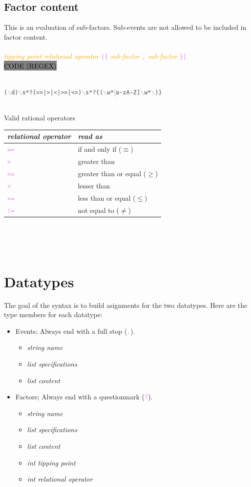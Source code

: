 \documentclass[15pt,a4paper,oneside]{article}
\newcommand{\regex}[1]{{\tiny\\\colorbox{grey}{\textcolor{black}{CODE (REGEX)}\hspace{0.87\textwidth}}}\vspace{-2.2em}\\\begin{framed}\bf{\textcolor{grey}{\vspace{-1.5em}\\\texttt{\small #1}}}\vspace{-0.33em}\end{framed}\vspace{-0.75em}}
\newcommand{\code}[1]{{\textcolor{violet}{\texttt{\small #1}}}}
\newcommand{\comment}[1]{{\textcolor{orange}{\it #1}}}
\begin{document}
\subsection{Factor content}
This is an evaluation of sub-factors. Sub-events are not allowed to be included in factor content.\\\\
\code{} \comment{tipping point} \hspace{2em} \comment{relational operator} \code{|\{} \comment{sub-factor} \code{,} \comment{sub-factor} \code{\}|}
\regex{($\backslash$d)$\backslash$s*?(==|>|<|>=|<=)$\backslash$s*?\{($\backslash$w*$[$a-zA-Z]$\backslash$w*$\backslash$)\}}
\ \\
Valid rational operators\\
\begin{tabular}{l|l}
{\it relational operator} & {\it read as}\\
\hline{\textcolor{violet}{\tt ==}} & if and only if ($\equiv$)\\
{\textcolor{violet}{\tt >}} & greater than \\
{\textcolor{violet}{\tt >=}} & greater than or equal ($\geq$)\\
{\textcolor{violet}{\tt <}} & lesser than\\
{\textcolor{violet}{\tt <=}} & less than or equal ($\leq$)\\
{\textcolor{violet}{\tt !=}} & not equal to ($\neq$)\\
\end{tabular}\\\\\\
\section{Datatypes}
The goal of the syntax is to build asignments for the two datatypes. Here are the type members for each datatype:\\

\begin{itemize}
\item Events; Always end with a full stop (\code{.}).
\begin{itemize}
\item {\it string name}
\item {\it list specifications}
\item {\it list content}
\end{itemize}
\item Factors; Always end with a questionmark (\code{?}).
\begin{itemize}
\item {\it string name}
\item {\it list specifications}
\item {\it list content}
\item {\it int tipping point}
\item {\it int relational operator}
\end{itemize}
\end{itemize}
\end{document}
